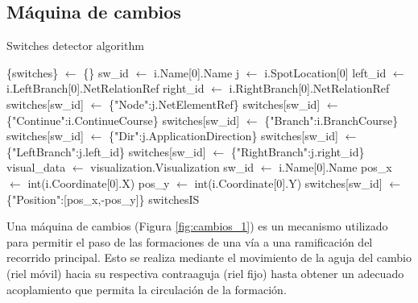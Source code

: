 \subsection{Máquina de cambios}

    \begin{algorithm}
            \caption{Switches detector algorithm}
            \label{alg:switches}
            \begin{algorithmic}
                \STATE \{switches\} $\gets$ \{\}
                            \STATE sw\_id $\gets$ i.Name[0].Name
                            \STATE j $\gets$ i.SpotLocation[0]
                            \STATE left\_id $\gets$ i.LeftBranch[0].NetRelationRef
                            \STATE right\_id $\gets$ i.RightBranch[0].NetRelationRef
                            \STATE switches[sw\_id] $\gets$ \{"Node":j.NetElementRef\}
                            \STATE switches[sw\_id] $\gets$ \{"Continue":i.ContinueCourse\}
                            \STATE switches[sw\_id] $\gets$ \{"Branch":i.BranchCourse\}
                            \STATE switches[sw\_id] $\gets$ \{"Dir":j.ApplicationDirection\}
                            \STATE switches[sw\_id] $\gets$ \{"LeftBranch":j.left\_id\}
                            \STATE switches[sw\_id] $\gets$ \{"RightBranch":j.right\_id\}
                        \ENDIF
                    \ENDFOR
                \ENDIF
                \STATE visual\_data $\gets$ visualization.Visualization
                        \STATE sw\_id $\gets$ i.Name[0].Name
                            \STATE pos\_x $\gets$ int(i.Coordinate[0].X)
                            \STATE pos\_y $\gets$ int(i.Coordinate[0].Y)
                            \STATE switches[sw\_id] $\gets$ \{"Position":[pos\_x,-pos\_y]\}
                        \ENDIF 
                    \ENDFOR
                \ENDIF
            \OUTPUT switchesIS
            \end{algorithmic}
        \end{algorithm}
        
    Una máquina de cambios (Figura \ref{fig:cambios_1}) es un mecanismo utilizado para permitir el paso de las formaciones de una vía a una ramificación del recorrido principal. Esto se realiza mediante el movimiento de la aguja del cambio (riel móvil) hacia su respectiva contraaguja (riel fijo) hasta obtener un adecuado acoplamiento que permita la circulación de la formación.

